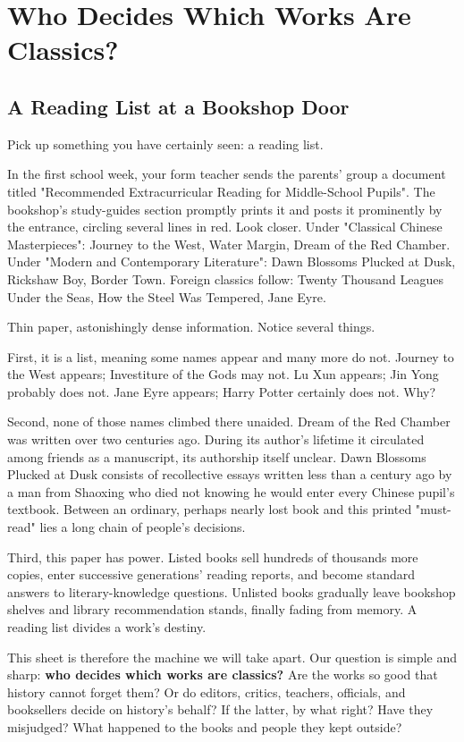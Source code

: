 \chapter[Who Decides the Classics?]{Who Decides Which Works Are Classics?}
\section{A Reading List at a Bookshop Door}
Pick up something you have certainly seen: a reading list.

In the first school week, your form teacher sends the parents' group a document titled "Recommended Extracurricular Reading for Middle-School Pupils". The bookshop's study-guides section promptly prints it and posts it prominently by the entrance, circling several lines in red. Look closer. Under "Classical Chinese Masterpieces": Journey to the West, Water Margin, Dream of the Red Chamber. Under "Modern and Contemporary Literature": Dawn Blossoms Plucked at Dusk, Rickshaw Boy, Border Town. Foreign classics follow: Twenty Thousand Leagues Under the Seas, How the Steel Was Tempered, Jane Eyre.

Thin paper, astonishingly dense information. Notice several things.

First, it is a list, meaning some names appear and many more do not. Journey to the West appears; Investiture of the Gods may not. Lu Xun appears; Jin Yong probably does not. Jane Eyre appears; Harry Potter certainly does not. Why?

Second, none of those names climbed there unaided. Dream of the Red Chamber was written over two centuries ago. During its author's lifetime it circulated among friends as a manuscript, its authorship itself unclear. Dawn Blossoms Plucked at Dusk consists of recollective essays written less than a century ago by a man from Shaoxing who died not knowing he would enter every Chinese pupil's textbook. Between an ordinary, perhaps nearly lost book and this printed "must-read" lies a long chain of people's decisions.

Third, this paper has power. Listed books sell hundreds of thousands more copies, enter successive generations' reading reports, and become standard answers to literary-knowledge questions. Unlisted books gradually leave bookshop shelves and library recommendation stands, finally fading from memory. A reading list divides a work's destiny.

This sheet is therefore the machine we will take apart. Our question is simple and sharp: \textbf{who decides which works are classics?} Are the works so good that history cannot forget them? Or do editors, critics, teachers, officials, and booksellers decide on history's behalf? If the latter, by what right? Have they misjudged? What happened to the books and people they kept outside?

